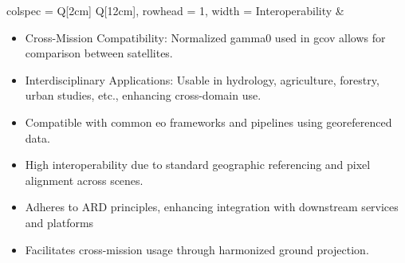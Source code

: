 \begin{longtblr}[
  caption = {Usability, Integrability, and Interoperability of \acs{gcov} product},
  label = {tab:gcov_usability_integrability_interoperability},
]{
  colspec = {Q[2cm] Q[12cm]},
  rowhead = 1,
  width = \linewidth
}
Interoperability &
\begin{itemize}
  \item Cross-Mission Compatibility: Normalized \gls{gamma0} used in \acs{gcov} allows for comparison between satellites.
  \item Interdisciplinary Applications: Usable in hydrology, agriculture, forestry, urban studies, etc., enhancing cross-domain use.
  \item Compatible with common \acs{eo} frameworks and pipelines using georeferenced data.
  \item High interoperability due to standard geographic referencing and pixel alignment across scenes.
  \item Adheres to ARD principles, enhancing integration with downstream services and platforms
  \item Facilitates cross-mission usage through harmonized ground projection.
\end{itemize}
\\
\hline
\end{longtblr}



